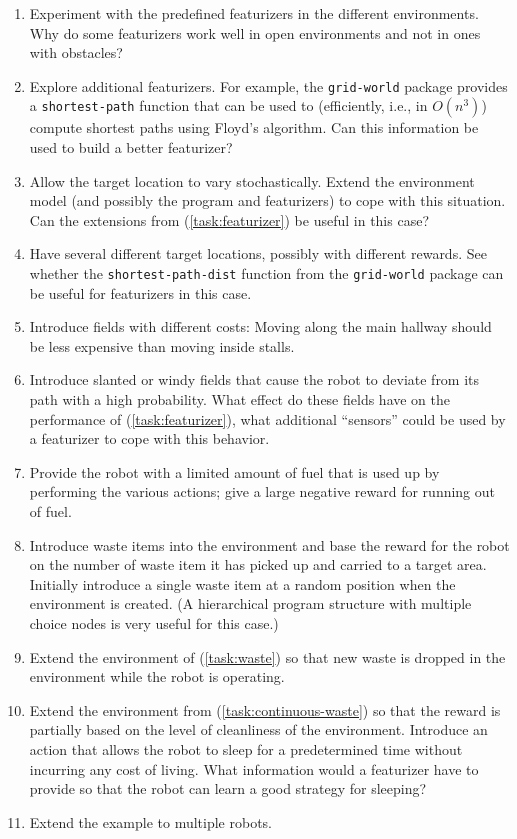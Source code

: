 \documentclass[a4paper]{amsart}
\begin{document}
\begin{enumerate}
\item Experiment with the predefined featurizers in the different
  environments.  Why do some featurizers work well in open
  environments and not in ones with obstacles?
\item \label{task:featurizer}Explore additional featurizers.  For
  example, the \texttt{grid-world} package provides a
  \texttt{shortest-path} function that can be used to (efficiently,
  i.e., in $O(n^3)$) compute shortest paths using Floyd's algorithm.
  Can this information be used to build a better featurizer?
\item Allow the target location to vary stochastically.  Extend the
  environment model (and possibly the program and featurizers) to cope
  with this situation.  Can the extensions from
  (\ref{task:featurizer}) be useful in this case?
\item Have several different target locations, possibly with different
  rewards.  See whether the \texttt{shortest-path-dist} function from
  the \texttt{grid-world} package can be useful for featurizers in
  this case.
\item Introduce fields with different costs:  Moving along the main
  hallway should be less expensive than moving inside stalls.
\item Introduce slanted or windy fields that cause the robot to
  deviate from its path with a high probability.  What effect do these
  fields have on the performance of (\ref{task:featurizer}), what
  additional ``sensors'' could be used by a featurizer to cope with
  this behavior.
\item Provide the robot with a limited amount of fuel that is used up
  by performing the various actions; give a large negative reward for
  running out of fuel.
\item \label{task:waste}Introduce waste items into the environment and
  base the reward for the robot on the number of waste item it has
  picked up and carried to a target area.  Initially introduce a
  single waste item at a random position when the environment is
  created.  (A hierarchical program structure with multiple choice
  nodes is very useful for this case.)
\item \label{task:continuous-waste}Extend the environment of
  (\ref{task:waste}) so that new waste is dropped in the environment
  while the robot is operating.  
\item Extend the environment from (\ref{task:continuous-waste}) so
  that the reward is partially based on the level of cleanliness of
  the environment.  Introduce an action that allows the robot to sleep
  for a predetermined time without incurring any cost of living.  What
  information would a featurizer have to provide so that the robot can
  learn a good strategy for sleeping?
\item Extend the example to multiple robots.
\end{enumerate}
\end{document}
